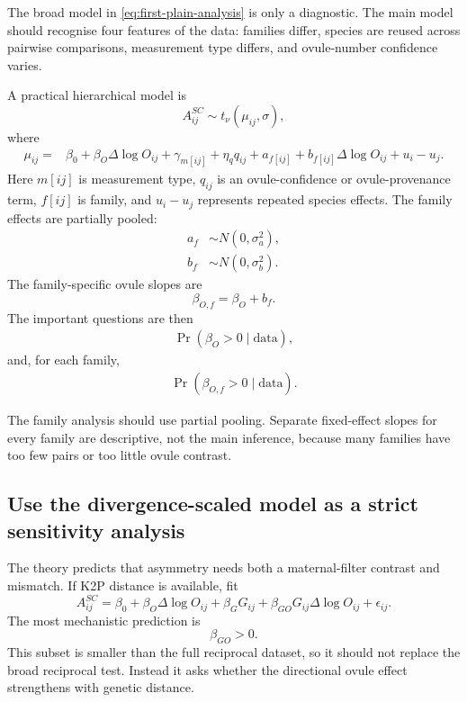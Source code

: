 The broad model in \eqref{eq:first-plain-analysis} is only a diagnostic. The main model should recognise four features of the data: families differ, species are reused across pairwise comparisons, measurement type differs, and ovule-number confidence varies.

A practical hierarchical model is
\begin{equation}
A^{SC}_{ij}\sim t_{\nu}(\mu_{ij},\sigma),
\label{eq:t-main-analysis}
\end{equation}
where
\begin{align}
\mu_{ij}={}&\beta_0+
\beta_O\Delta\log O_{ij}
+\gamma_{m[ij]}
+\eta_q q_{ij}
+a_{f[ij]}
+b_{f[ij]}\Delta\log O_{ij}
+u_i-u_j .
\label{eq:main-analysis-mu}
\end{align}
Here $m[ij]$ is measurement type, $q_{ij}$ is an ovule-confidence or ovule-provenance term, $f[ij]$ is family, and $u_i-u_j$ represents repeated species effects. The family effects are partially pooled:
\begin{align}
a_f&\sim N(0,\sigma_a^2),\\
b_f&\sim N(0,\sigma_b^2).
\end{align}
The family-specific ovule slopes are
\begin{equation}
\beta_{O,f}=\beta_O+b_f.
\end{equation}
The important questions are then
\begin{align}
\Pr(\beta_O>0\mid \mathrm{data}),
\end{align}
and, for each family,
\begin{align}
\Pr(\beta_{O,f}>0\mid \mathrm{data}).
\end{align}

\begin{cautionbox}
The family analysis should use partial pooling. Separate fixed-effect slopes for every family are descriptive, not the main inference, because many families have too few pairs or too little ovule contrast.
\end{cautionbox}

\subsection{Use the divergence-scaled model as a strict sensitivity analysis}

The theory predicts that asymmetry needs both a maternal-filter contrast and mismatch. If K2P distance is available, fit
\begin{equation}
A^{SC}_{ij}=\beta_0+\beta_O\Delta\log O_{ij}+\beta_GG_{ij}+\beta_{GO}G_{ij}\Delta\log O_{ij}+\epsilon_{ij}.
\label{eq:strict-G-analysis}
\end{equation}
The most mechanistic prediction is
\begin{equation}
\boxed{\beta_{GO}>0.}
\end{equation}
This subset is smaller than the full reciprocal dataset, so it should not replace the broad reciprocal test. Instead it asks whether the directional ovule effect strengthens with genetic distance.

